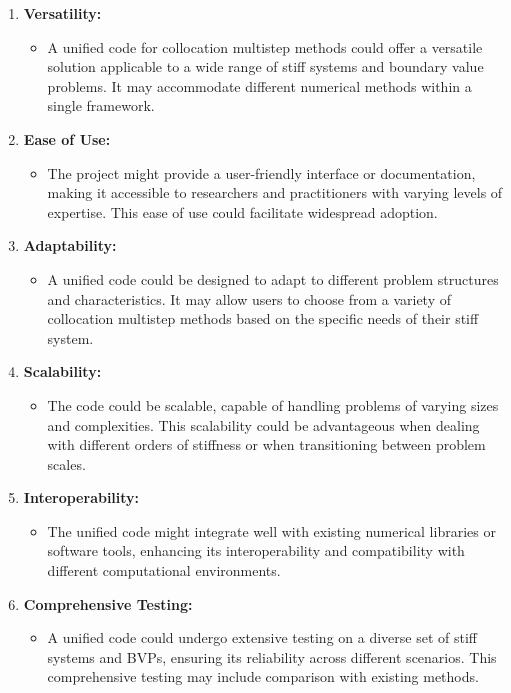 \documentclass{article}
\begin{document}
\begin{enumerate}
    \item \textbf{Versatility:}
    \begin{itemize}
        \item A unified code for collocation multistep methods could offer a versatile solution applicable to a wide range of stiff systems and boundary value problems. It may accommodate different numerical methods within a single framework.
    \end{itemize}
    
    \item \textbf{Ease of Use:}
    \begin{itemize}
        \item The project might provide a user-friendly interface or documentation, making it accessible to researchers and practitioners with varying levels of expertise. This ease of use could facilitate widespread adoption.
    \end{itemize}
    
    \item \textbf{Adaptability:}
    \begin{itemize}
        \item A unified code could be designed to adapt to different problem structures and characteristics. It may allow users to choose from a variety of collocation multistep methods based on the specific needs of their stiff system.
    \end{itemize}
    
    \item \textbf{Scalability:}
    \begin{itemize}
        \item The code could be scalable, capable of handling problems of varying sizes and complexities. This scalability could be advantageous when dealing with different orders of stiffness or when transitioning between problem scales.
    \end{itemize}
    
    \item \textbf{Interoperability:}
    \begin{itemize}
        \item The unified code might integrate well with existing numerical libraries or software tools, enhancing its interoperability and compatibility with different computational environments.
    \end{itemize}
    
    \item \textbf{Comprehensive Testing:}
    \begin{itemize}
        \item A unified code could undergo extensive testing on a diverse set of stiff systems and BVPs, ensuring its reliability across different scenarios. This comprehensive testing may include comparison with existing methods.
    \end{itemize}
    

\end{enumerate}
\end{document}
